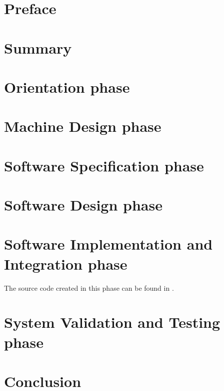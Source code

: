 \documentclass{report}
\begin{document}
\maketitle
\tableofcontents
\newpage

\setlength{\parskip}{.5em}

\chapter{Preface}
    

\chapter{Summary}
    

\chapter{Orientation phase} \label{orientation}
    
    
    

\chapter{Machine Design phase} \label{machine-design}
    
    
    

\chapter{Software Specification phase} \label{software-specification}
    
    
    

\chapter{Software Design phase} \label{software-design}
    
    
    

\chapter{Software Implementation and Integration phase} \label{software-implementation}
The source code created in this phase can be found in .
    
    

\chapter{System Validation and Testing phase} \label{system-validation}
    
    

\chapter{Conclusion}
    


\end{document}
